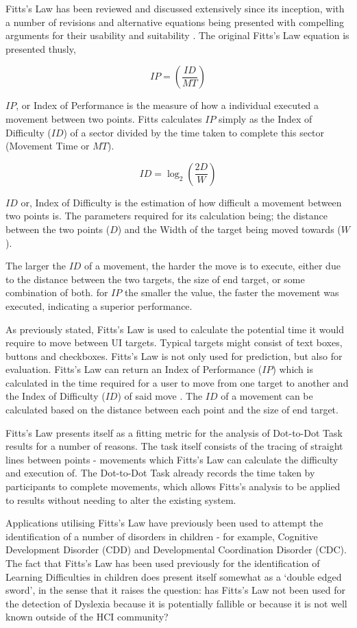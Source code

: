 			Fitts’s Law has been reviewed and discussed extensively since its inception, with a number of revisions and alternative equations being presented with compelling arguments for their usability and suitability \cite{MacKenzie1992, MacKenzie1995}. The original Fitts’s Law equation is presented thusly,

			\[IP = \left(\frac{ID}{MT}\right)\]
		
			\(IP\), or Index of Performance is the measure of how a individual executed a movement between two points. Fitts calculates \(IP\) simply as the Index of Difficulty (\(ID\)) of a sector divided by the time taken to complete this sector (Movement Time or \(MT\)).
			
			\[ID = \log_2\left( \frac{2D}{W}\right)\]
			
			\(ID\) or, Index of Difficulty is the estimation of how difficult a movement between two points is. The parameters required for its calculation being; the distance between the two points (\(D\)) and the Width of the target being moved towards (\(W\)).
			
			The larger the \(ID\) of a movement, the harder the move is to execute, either due to the distance between the two targets, the size of end target, or some combination of both. for \(IP\) the smaller the value, the faster the movement was executed, indicating a superior performance. 
			
			As previously stated, Fitts’s Law is used to calculate the potential time it would require to move between UI targets. Typical targets might consist of text boxes, buttons and checkboxes. Fitts’s Law is not only used for prediction, but also for evaluation. Fitts’s Law can return an Index of Performance (\(IP\)) which is calculated in the time required for a user to move from one target to another and the Index of Difficulty (\(ID\)) of said move \cite{Fitts1954}.  The \(ID\) of a movement can be calculated based on the distance between each point and the size of end target.

			Fitts’s Law presents itself as a fitting metric for the analysis of Dot-to-Dot Task results for a number of reasons. The task itself consists of the tracing of straight lines between points  - movements which Fitts’s Law can calculate the difficulty and execution of. The Dot-to-Dot Task already records the time taken by participants to complete movements, which allows Fitts’s analysis to be applied to results without needing to alter the existing system.

			Applications utilising Fitts’s Law have previously been used to attempt the identification of a number of disorders in children - for example, Cognitive Development Disorder (CDD) and Developmental Coordination Disorder (CDC). The fact that Fitts’s Law has been used previously for the identification of Learning Difficulties in children does present itself somewhat as a ‘double edged sword’, in the sense that it raises the question: has Fitts’s Law not been used for the detection of Dyslexia because it is potentially fallible or because it is not well known outside of the HCI community?
		

